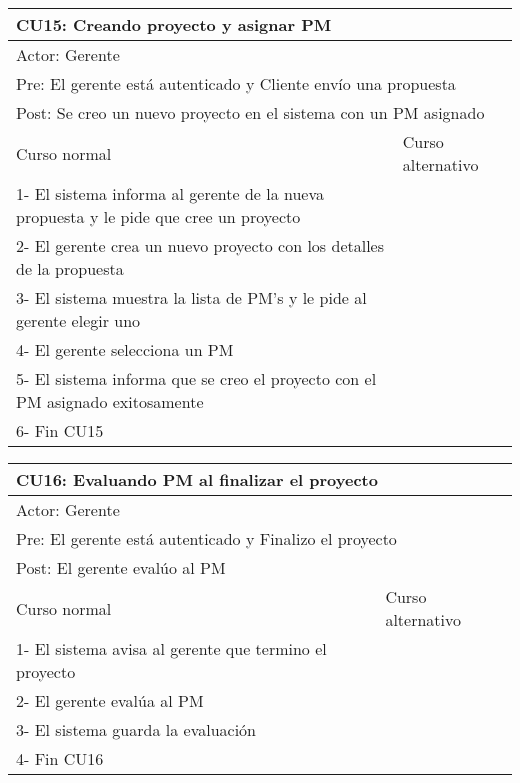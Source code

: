 \begin{table}[H]
  \begin{adjustbox}{max width = \textwidth}
  \begin{tabular}{|l|l|}
    \hline
    \multicolumn{2}{|l|}{CU15: Creando proyecto y asignar PM} \\\hline
    \multicolumn{2}{|l|}{Actor: Gerente} \\\hline
    \multicolumn{2}{|l|}{Pre: El gerente está autenticado y Cliente envío una propuesta} \\\hline
    \multicolumn{2}{|l|}{Post: Se creo un nuevo proyecto en el sistema con un PM asignado} \\\hline
     Curso normal & Curso alternativo\\ \hline
	 1- El sistema informa al gerente de la nueva propuesta y le pide que cree un proyecto & \\ \hline
	 2- El gerente crea un nuevo proyecto con los detalles de la propuesta & \\ \hline
	 3- El sistema muestra la lista de PM's y le pide al gerente elegir uno & \\ \hline
     4- El gerente selecciona un PM & \\ \hline
	 5- El sistema informa que se creo el proyecto con el PM asignado exitosamente & \\ \hline
     6- Fin CU15 & \\ \hline
  \end{tabular}
  \end{adjustbox}
\end{table}

\begin{table}[H]
  \begin{adjustbox}{max width = \textwidth}
  \begin{tabular}{|l|l|}
    \hline
    \multicolumn{2}{|l|}{CU16: Evaluando PM al finalizar el proyecto} \\\hline
    \multicolumn{2}{|l|}{Actor: Gerente} \\\hline
    \multicolumn{2}{|l|}{Pre: El gerente está autenticado y Finalizo el proyecto} \\\hline
    \multicolumn{2}{|l|}{Post: El gerente evalúo al PM} \\\hline
     Curso normal & Curso alternativo\\ \hline
	 1- El sistema avisa al gerente que termino el proyecto & \\ \hline
	 2- El gerente evalúa al PM & \\ \hline
	 3- El sistema guarda la evaluación & \\ \hline
   4- Fin CU16 & \\ \hline
  \end{tabular}
  \end{adjustbox}
\end{table}

